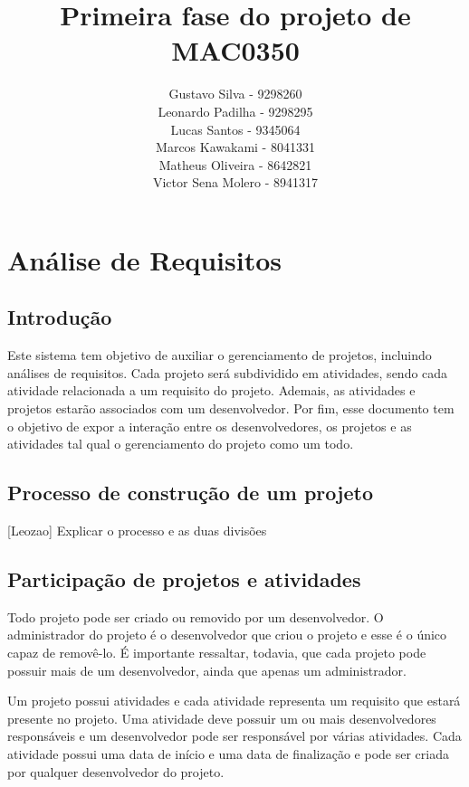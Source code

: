 \documentclass{article}
\title{Primeira fase do projeto de MAC0350}
\author{Gustavo Silva - 9298260\\Leonardo Padilha - 9298295 \\Lucas Santos - 9345064 \\Marcos Kawakami - 8041331 \\Matheus Oliveira - 8642821 \\Victor Sena Molero - 8941317}
\date{}
\begin{document}
\maketitle


\section{Análise de Requisitos}

	\subsection{Introdução}
	Este sistema tem objetivo de auxiliar o gerenciamento de projetos, incluindo análises de requisitos. Cada projeto será subdividido em atividades, sendo cada atividade relacionada a um requisito do projeto. Ademais, as atividades e projetos estarão associados com um desenvolvedor. Por fim, esse documento tem o objetivo de expor a interação entre os desenvolvedores, os projetos e as atividades tal qual o gerenciamento do projeto como um todo.

	\subsection{Processo de construção de um projeto}
	[Leozao] Explicar o processo e as duas divisões

	\subsection{Participação de projetos e atividades}
	Todo projeto pode ser criado ou removido por um desenvolvedor. O administrador do projeto é o desenvolvedor que criou o projeto e esse é o único capaz de removê-lo. É importante ressaltar, todavia, que cada projeto pode possuir mais de um desenvolvedor, ainda que apenas um administrador.

	Um projeto possui atividades e cada atividade representa um requisito que estará presente no projeto. Uma atividade deve possuir um ou mais desenvolvedores responsáveis e um desenvolvedor pode ser responsável por várias atividades. Cada atividade possui uma data de início e uma data de finalização e pode ser criada por qualquer desenvolvedor do projeto.
\end{document}
